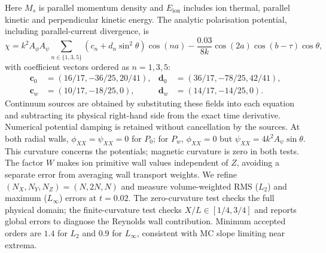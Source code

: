 \documentclass[11pt,a4paper]{article}
\begin{document}
Here $M_s$ is parallel momentum density and $E_{\mathrm{ion}}$ includes ion
thermal, parallel kinetic and perpendicular kinetic energy. The analytic
polarisation potential, including parallel-current divergence, is
\[
 \chi=k^2 A_\phi A_\psi
       \sum_{n\in\{1,3,5\}}(c_n+d_n\sin^2\theta)\cos(na)
       -\frac{0.03}{8k}\cos(2a)\cos(b-\tau)\cos\theta,
\]
with coefficient vectors ordered as $n=1,3,5$:
\begin{align*}
 \boldsymbol c_0&=(16/17,-36/25,20/41),&
 \boldsymbol d_0&=(36/17,-78/25,42/41),\\
 \boldsymbol c_w&=(10/17,-18/25,0),&
 \boldsymbol d_w&=(14/17,-14/25,0).
\end{align*}
Continuum sources are obtained by substituting these fields into each equation
and subtracting its physical right-hand side from the exact time derivative.
Numerical potential damping is retained without cancellation by the sources.
At both radial walls, $\phi_{XX}=\psi_{XX}=0$ for $P_0$; for $P_w$,
$\phi_{XX}=0$ but $\psi_{XX}=4k^2A_\psi\sin\theta$.
This curvature concerns the potentials; magnetic curvature is zero in both
tests. The factor $W$ makes ion primitive wall values independent of $Z$,
avoiding a separate error from averaging wall transport weights.
We refine $(N_X,N_Y,N_Z)=(N,2N,N)$ and measure volume-weighted RMS ($L_2$) and
maximum ($L_\infty$) errors at $t=0.02$.
The zero-curvature test checks the full physical domain; the finite-curvature
test checks $X/L\in[1/4,3/4]$ and reports global errors to diagnose the Reynolds
wall contribution. Minimum accepted orders are $1.4$ for $L_2$ and $0.9$ for
$L_\infty$, consistent with MC slope limiting near extrema.
\end{document}
